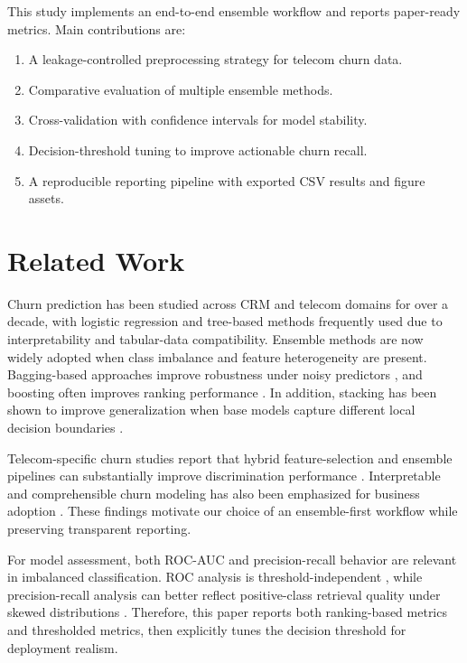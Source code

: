 \documentclass[conference]{IEEEtran}
\begin{document}
This study implements an end-to-end ensemble workflow and reports paper-ready metrics. Main contributions are:
\begin{enumerate}
\item A leakage-controlled preprocessing strategy for telecom churn data.
\item Comparative evaluation of multiple ensemble methods.
\item Cross-validation with confidence intervals for model stability.
\item Decision-threshold tuning to improve actionable churn recall.
\item A reproducible reporting pipeline with exported CSV results and figure assets.
\end{enumerate}

\section{Related Work}
Churn prediction has been studied across CRM and telecom domains for over a decade, with logistic regression and tree-based methods frequently used due to interpretability and tabular-data compatibility. Ensemble methods are now widely adopted when class imbalance and feature heterogeneity are present. Bagging-based approaches improve robustness under noisy predictors \cite{breiman1996bagging}, and boosting often improves ranking performance \cite{freund1997adaboost,chen2016xgboost}. In addition, stacking has been shown to improve generalization when base models capture different local decision boundaries \cite{wolpert1992stacked}.

Telecom-specific churn studies report that hybrid feature-selection and ensemble pipelines can substantially improve discrimination performance \cite{idris2013rotboost,keramati2014improved}. Interpretable and comprehensible churn modeling has also been emphasized for business adoption \cite{verbeke2011rule}. These findings motivate our choice of an ensemble-first workflow while preserving transparent reporting.

For model assessment, both ROC-AUC and precision-recall behavior are relevant in imbalanced classification. ROC analysis is threshold-independent \cite{fawcett2006roc}, while precision-recall analysis can better reflect positive-class retrieval quality under skewed distributions \cite{davis2006relationship}. Therefore, this paper reports both ranking-based metrics and thresholded metrics, then explicitly tunes the decision threshold for deployment realism.
\end{document}
